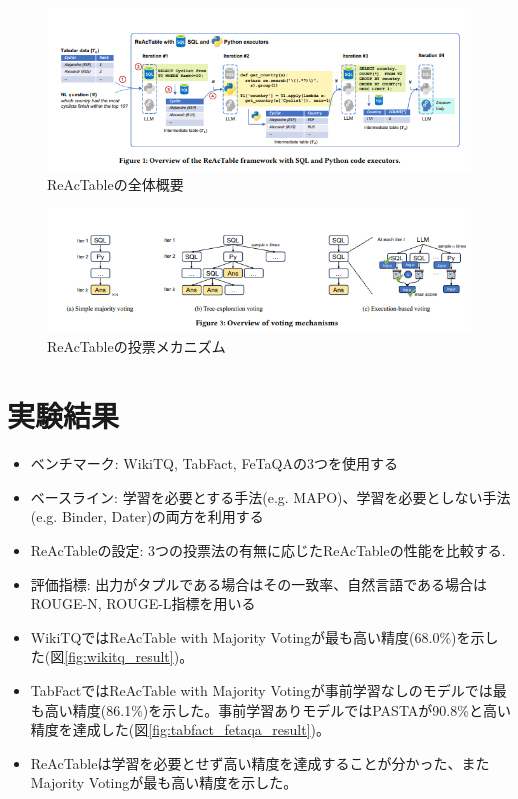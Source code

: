 \documentclass[dvipdfmx,uplatex]{jsarticle}
\theoremstyle{remark}
\newenvironment{experiment}[1]{
    \begin{tcolorbox}[
        colframe=violet,
        colback=violet!10!white,
        colbacktitle=violet!40!white,
        coltitle=black,
        fonttitle=\bfseries,
        title={#1}
    ]
}{
    \end{tcolorbox}
}
\begin{document}
\begin{figure}
    \centering
    \includegraphics[width=1.0\textwidth]{img/ReAcTable/overview.png}
    \caption{ReAcTableの全体概要}
    \label{fig:overview}
\end{figure}

\begin{figure}
    \centering
    \includegraphics[width=1.0\textwidth]{img/ReAcTable/voting.png}
    \caption{ReAcTableの投票メカニズム}
    \label{fig:voting}
\end{figure}

\section{実験結果}
\begin{experiment}{実験手法}
\begin{itemize}
    \item ベンチマーク: WikiTQ, TabFact, FeTaQAの3つを使用する
    \item ベースライン: 学習を必要とする手法(e.g. MAPO)、学習を必要としない手法(e.g. Binder, Dater)の両方を利用する
    \item ReAcTableの設定: 3つの投票法の有無に応じたReAcTableの性能を比較する.
    \item 評価指標: 出力がタプルである場合はその一致率、自然言語である場合はROUGE-N, ROUGE-L指標を用いる
\end{itemize}
\end{experiment}

\begin{experiment}{実験結果}
\begin{itemize}
    \item WikiTQではReAcTable with Majority Votingが最も高い精度(68.0\%)を示した(図\ref{fig:wikitq_result})。
    \item TabFactではReAcTable with Majority Votingが事前学習なしのモデルでは最も高い精度(86.1\%)を示した。事前学習ありモデルではPASTAが90.8\%と高い精度を達成した(図\ref{fig:tabfact_fetaqa_result})。
    \item ReAcTableは学習を必要とせず高い精度を達成することが分かった、またMajority Votingが最も高い精度を示した。
\end{itemize}
\end{experiment}
\end{document}
